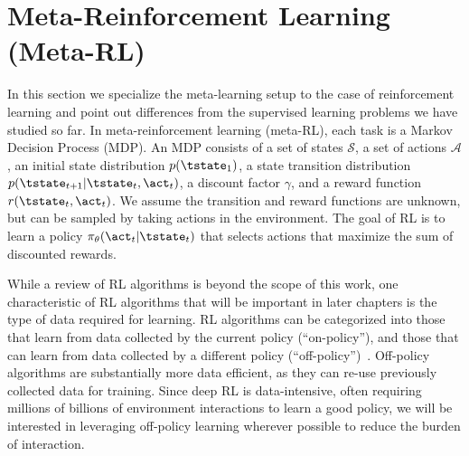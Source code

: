 \section{Meta-Reinforcement Learning (Meta-RL)}
\label{sec:meta-learning-rl}
In this section we specialize the meta-learning setup to the case of reinforcement learning and point out differences from the supervised learning problems we have studied so far.
In meta-reinforcement learning (meta-RL), each task is a Markov Decision Process (MDP).
An MDP consists of a set of states $\mathcal{S}$, a set of actions $\mathcal{A}$, an initial state distribution $p(\tstate_1)$, a state transition distribution $p(\tstate_{t+1}|\tstate_t,\act_t)$, a discount factor $\gamma$, and a reward function $r(\tstate_t, \act_t)$.
We assume the transition and reward functions are unknown, but can be sampled by taking actions in the environment.
The goal of RL is to learn a policy $\pi_{\theta}(\act_t|\tstate_t)$ that selects actions that maximize the sum of discounted rewards.

While a review of RL algorithms is beyond the scope of this work, one characteristic of RL algorithms that will be important in later chapters is the type of data required for learning.
RL algorithms can be categorized into those that learn from data collected by the current policy (``on-policy''), and those that can learn from data collected by a different policy (``off-policy'')~\citep{sutton}.
Off-policy algorithms are substantially more data efficient, as they can re-use previously collected data for training.
Since deep RL is data-intensive, often requiring millions of billions of environment interactions to learn a good policy, we will be interested in leveraging off-policy learning wherever possible to reduce the burden of interaction.

